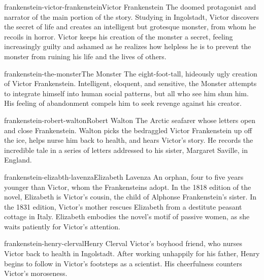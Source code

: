 \documentclass[preview]{standalone}
\begin{document}
\genpage

\begin{snippetcharacter}{frankenstein-victor-frankenstein}{Victor Frankenstein}
    The doomed protagonist and narrator of the main portion of the story. Studying in Ingolstadt, Victor discovers the secret of life and creates an intelligent but grotesque monster, from whom he recoils in horror. Victor keeps his creation of the monster a secret, feeling increasingly guilty and ashamed as he realizes how helpless he is to prevent the monster from ruining his life and the lives of others.
\end{snippetcharacter}

\begin{snippetcharacter}{frankenstein-the-monster}{The Monster}
    The eight-foot-tall, hideously ugly creation of Victor Frankenstein. Intelligent, eloquent, and sensitive, the Monster attempts to integrate himself into human social patterns, but all who see him shun him. His feeling of abandonment compels him to seek revenge against his creator.
\end{snippetcharacter}

\begin{snippetcharacter}{frankenstein-robert-walton}{Robert Walton}
    The Arctic seafarer whose letters open and close Frankenstein. Walton picks the bedraggled Victor Frankenstein up off the ice, helps nurse him back to health, and hears Victor's story. He records the incredible tale in a series of letters addressed to his sister, Margaret Saville, in England.
\end{snippetcharacter}

\begin{snippetcharacter}{frankenstein-elizabth-lavenza}{Elizabeth Lavenza}
    An orphan, four to five years younger than Victor, whom the Frankensteins adopt. In the 1818 edition of the novel, Elizabeth is Victor's cousin, the child of Alphonse Frankenstein's sister. In the 1831 edition, Victor's mother rescues Elizabeth from a destitute peasant cottage in Italy. Elizabeth embodies the novel's motif of passive women, as she waits patiently for Victor's attention.
\end{snippetcharacter}

\begin{snippetcharacter}{frankenstein-henry-clerval}{Henry Clerval}
    Victor's boyhood friend, who nurses Victor back to health in Ingolstadt. After working unhappily for his father, Henry begins to follow in Victor's footsteps as a scientist. His cheerfulness counters Victor's moroseness.
\end{snippetcharacter}
\end{document}
